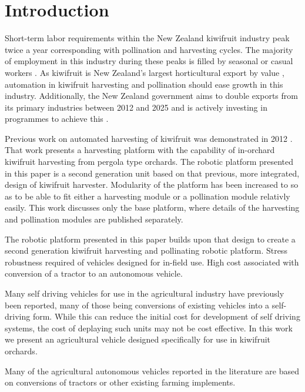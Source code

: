 \documentclass[preprint,authoryear,12pt]{elsarticle}
\begin{document}

\section{Introduction}
\label{sect:intro}
Short-term labor requirements within the New Zealand kiwifruit industry peak twice a year corresponding with pollination and harvesting cycles.
The majority of employment in this industry during these peaks is filled by seasonal or casual workers \citep{Timmins2009}.
As kiwifruit is New Zealand's largest horticultural export by value \citep{StatisticsNewZealand2015}, automation in kiwifruit harvesting and pollination should ease growth in this industry.
Additionally, the New Zealand government aims to double exports from its primary industries between 2012 and 2025 and is actively investing in programmes to achieve this \citep{MinistryPrimaryIndustries2015}.

Previous work on automated harvesting of kiwifruit was demonstrated in 2012 \citep{Scarfe2012}.
That work presents a harvesting platform with the capability of in-orchard kiwifruit harvesting from pergola type orchards.
The robotic platform presented in this paper is a second generation unit based on that previous, more integrated, design of kiwifruit harvester.
Modularity of the platform has been increased to so as to be able to fit either a harvesting module or a pollination module relativly easily.
This work discusses only the base platform, where details of the harvesting and pollination modules are published separately.


The robotic platform presented in this paper builds upon that design to create a second generation kiwifruit harvesting and pollinating robotic platform.
Stress robustness required of vehicles designed for in-field use.
High cost associated with conversion of a tractor to an autonomous vehicle.


Many self driving vehicles for use in the agricultural industry have previously been reported, many of those being conversions of existing vehicles into a self-driving form.
While this can reduce the initial cost for development of self driving systems, the cost of deplaying such units may not be cost effective.
In this work we present an agricultural vehicle designed specifically for use in kiwifruit orchards.

Many of the agricultural autonomous vehicles reported in the literature are based on conversions of tractors or other existing farming implements.
\end{document}
